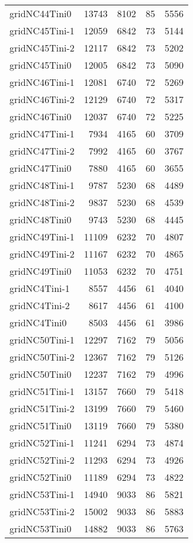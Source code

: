 \documentclass[../../../thesis.tex]{subfiles}
\begin{document}
\begin{longtable}{lrrrr}
gridNC44Tini0 & 13743 & 8102 & 85 & 5556 \\
gridNC45Tini-1 & 12059 & 6842 & 73 & 5144 \\
gridNC45Tini-2 & 12117 & 6842 & 73 & 5202 \\
gridNC45Tini0 & 12005 & 6842 & 73 & 5090 \\
gridNC46Tini-1 & 12081 & 6740 & 72 & 5269 \\
gridNC46Tini-2 & 12129 & 6740 & 72 & 5317 \\
gridNC46Tini0 & 12037 & 6740 & 72 & 5225 \\
gridNC47Tini-1 & 7934 & 4165 & 60 & 3709 \\
gridNC47Tini-2 & 7992 & 4165 & 60 & 3767 \\
gridNC47Tini0 & 7880 & 4165 & 60 & 3655 \\
gridNC48Tini-1 & 9787 & 5230 & 68 & 4489 \\
gridNC48Tini-2 & 9837 & 5230 & 68 & 4539 \\
gridNC48Tini0 & 9743 & 5230 & 68 & 4445 \\
gridNC49Tini-1 & 11109 & 6232 & 70 & 4807 \\
gridNC49Tini-2 & 11167 & 6232 & 70 & 4865 \\
gridNC49Tini0 & 11053 & 6232 & 70 & 4751 \\
gridNC4Tini-1 & 8557 & 4456 & 61 & 4040 \\
gridNC4Tini-2 & 8617 & 4456 & 61 & 4100 \\
gridNC4Tini0 & 8503 & 4456 & 61 & 3986 \\
gridNC50Tini-1 & 12297 & 7162 & 79 & 5056 \\
gridNC50Tini-2 & 12367 & 7162 & 79 & 5126 \\
gridNC50Tini0 & 12237 & 7162 & 79 & 4996 \\
gridNC51Tini-1 & 13157 & 7660 & 79 & 5418 \\
gridNC51Tini-2 & 13199 & 7660 & 79 & 5460 \\
gridNC51Tini0 & 13119 & 7660 & 79 & 5380 \\
gridNC52Tini-1 & 11241 & 6294 & 73 & 4874 \\
gridNC52Tini-2 & 11293 & 6294 & 73 & 4926 \\
gridNC52Tini0 & 11189 & 6294 & 73 & 4822 \\
gridNC53Tini-1 & 14940 & 9033 & 86 & 5821 \\
gridNC53Tini-2 & 15002 & 9033 & 86 & 5883 \\
gridNC53Tini0 & 14882 & 9033 & 86 & 5763 \\

\end{longtable}
\end{document}

